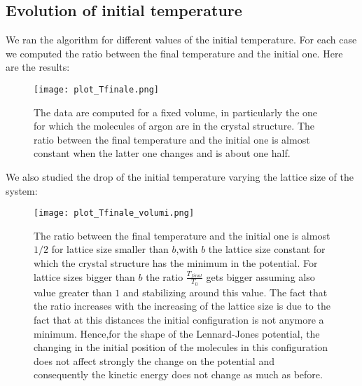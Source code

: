 \documentclass[10pt,a4paper,titlepage]{article}
\begin{document}
\subsection*{Evolution of initial temperature}
\noindent We ran the algorithm for different values of the initial temperature. For each case we computed the ratio between the final temperature and the initial one. Here are the results:
\begin{figure}[H]
\begin{center}
\texttt{[image: plot\_Tfinale.png]}
\caption{The data are computed for a fixed volume, in particularly the one for which the molecules of argon are in the crystal structure. The ratio between the final temperature and the initial one is almost constant when the latter one changes and is about one half.}
\end{center}
\end{figure}
\noindent We also studied the drop of the initial temperature varying the lattice size of the system: \begin{figure}[H]
\begin{center}
\texttt{[image: plot\_Tfinale\_volumi.png]}
\caption{The ratio between the final temperature and the initial one is almost $1/2$ for lattice size smaller than $b$,with $b$ the lattice size constant for which the crystal structure has the minimum in the potential. For lattice sizes bigger than $b$ the ratio $\frac{T_{final}}{T_0}$ gets bigger assuming also value greater than $1$ and stabilizing around this value. The fact that the ratio increases with the increasing of the lattice size is due to the fact that at this distances the initial configuration is not anymore a minimum. Hence,for the shape of the Lennard-Jones potential, the changing in the initial position of the molecules  in this configuration does not affect strongly the change on the potential and consequently the kinetic energy does not change as much as before.}
\end{center}
\end{figure} 
\end{document}
